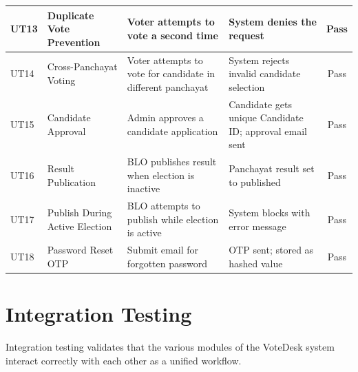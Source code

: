 \begin{longtable}{|p{1.5cm}|p{2.5cm}|p{4cm}|p{4cm}|c|}
\hline
UT13 & Duplicate Vote Prevention & Voter attempts to vote a second time & System denies the request & Pass \\
\hline
UT14 & Cross-Panchayat Voting & Voter attempts to vote for candidate in different panchayat & System rejects invalid candidate selection & Pass \\
\hline
UT15 & Candidate Approval & Admin approves a candidate application & Candidate gets unique Candidate ID; approval email sent & Pass \\
\hline
UT16 & Result Publication & BLO publishes result when election is inactive & Panchayat result set to published & Pass \\
\hline
UT17 & Publish During Active Election & BLO attempts to publish while election is active & System blocks with error message & Pass \\
\hline
UT18 & Password Reset OTP & Submit email for forgotten password & OTP sent; stored as hashed value & Pass \\
\end{longtable}

\newpage
\section{Integration Testing}

Integration testing validates that the various modules of the VoteDesk system interact correctly with each other as a unified workflow.

